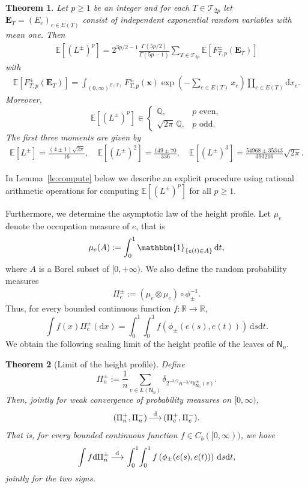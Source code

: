 \documentclass[english,11pt]{smfart}
\newcommand{\ndQ}{\mathbb{Q}}
\newcommand{\ndR}{\mathbb{R}}
\newcommand{\Ex}[1]{\mathbb{E}[#1]}
\newcommand{\Exb}[1]{\mathbb{E}\left[#1\right]}
\newcommand{\one}{{\mathbbm{1}}}
\newcommand{\convdis}{\,{\buildrel \mathrm{d} \over \longrightarrow}\,}
\newcommand{\he}{\mathrm{h}}
\newcommand{\cT}{\mathcal{T}}
\newcommand{\mN}{\mathsf{N}}
\newtheorem{theorem}{Theorem}[section]
\numberwithin{equation}{section}
\begin{document}
\begin{theorem}
	\label{te:smoments}
	Let $p \ge 1$ be an integer and for each $T \in \cT_{2p}$ let $\bm{E}_T=(E_e)_{e\in E(T)}$ consist of independent exponential
	random variables with mean one. Then
	\begin{align*}
		\Ex{(L^\pm)^p} = 2^{3p/2-1}\frac{\Gamma(5p/2)}{\Gamma(5p-1)} \sum_{T\in\cT_{2p}} \Ex{F_{T,p}^\pm(\bm E_T)}
	\end{align*}
	with
	\begin{align*}
		\Ex{F_{T,p}^\pm(\bm E_T)}
		=
		\int_{(0,\infty)^{E(T)}}
		F_{T,p}^\pm(\bm x)
		\exp\left(-\sum_{e\in E(T)}x_e\right)
		\prod_{e\in E(T)}\mathrm{d}x_e.
	\end{align*}
	Moreover,
	\[
		\Ex{(L^\pm)^p} \in
			\begin{cases}
				\ndQ, & p\text{ even},\\
				\sqrt{2\pi}\,\ndQ, & p\text{ odd}.
			\end{cases}
	\]
	The first three moments are given by
	\begin{align*}
		\Ex{L^\pm} =
		\frac{(4\pm1)\sqrt{2\pi}}{16},\quad
		\Ex{(L^\pm)^2}
		=
		\frac{149\pm70}{336},\quad
		\Ex{(L^\pm)^3}
		=
		\frac{54968\pm35343}{393216}\sqrt{2\pi}.
	\end{align*}
\end{theorem}
In Lemma~\ref{le:compute} below we describe an explicit procedure using rational arithmetic operations for computing $\Exb{(L^\pm)^p}$ for all $p \ge 1$.
\smallskip

Furthermore, we determine the asymptotic law of the height profile. Let $\mu_e$ denote the occupation measure of $e$, that is
\[
	\mu_e(A) := \int_0^1 \one_{\{e(t)\in A\}}\,\mathrm{d}t, 
\]
where $A$ is a Borel subset of $[0,+\infty)$.
We also define the random probability measures
\begin{align*}
	\Pi_e^\pm :=(\mu_e \otimes \mu_e) \circ \phi_\pm^{-1}.
\end{align*}
Thus, for every bounded continuous function $f: \ndR \to \ndR$,
\[
	\int f(x) \Pi_e^\pm(\mathrm{d}x) = \int_0^1 \int_0^1 f\left(\phi_\pm(e(s),e(t))\right)\,\mathrm{d}s\mathrm{d}t.
\]
We obtain the following scaling limit of the height profile of the leaves of $\mN_n$.
\begin{theorem}[Limit of the height profile]
	\label{te:profile}
	Define
	\[
	\Pi_n^\pm := \frac{1}{n} \sum_{v\in L(\mN_n)} \delta_{ 2^{-3/2}n^{-3/4} \he_{\mN_n}^\pm(v)}.
	\]
	Then, jointly for weak convergence of probability measures on
	$[0,\infty)$,
	\[
	(\Pi_n^+,\Pi_n^-)\convdis(\Pi_e^+,\Pi_e^-).
	\]
	That is, for every bounded continuous function $f \in C_{b}([0,\infty))$, we have
	\[
		\int f\mathrm d\Pi_n^\pm \convdis \int_0^1\!\int_0^1 f\left(\phi_\pm(e(s),e(t))\right)\,\mathrm ds\mathrm dt,
	\]
	jointly for the two signs.
\end{theorem}
\end{document}
